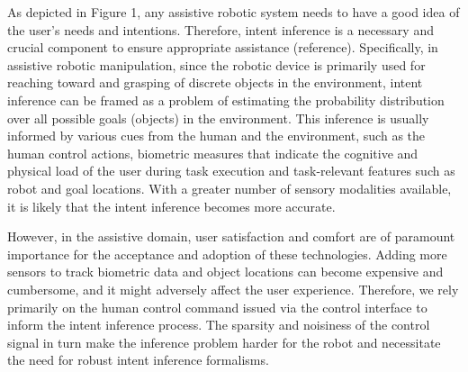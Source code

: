 As depicted in Figure 1, any assistive robotic system needs to have a good idea of the user's needs and intentions. Therefore, intent inference is a necessary and crucial component to ensure appropriate assistance (reference). Specifically, in assistive robotic manipulation, since the robotic device is primarily used for reaching toward and grasping of discrete objects in the environment, intent inference can be framed as a problem of estimating the probability distribution over all possible goals (objects) in the environment. This inference is usually informed by various cues from the human and the environment, such as the human control actions, biometric measures that indicate the cognitive and physical load of the user during task execution and task-relevant features such as robot and goal locations. With a greater number of sensory modalities available, it is likely that the intent inference becomes more accurate. 

However, in the assistive domain, user satisfaction and comfort are of paramount importance for the acceptance and adoption of these technologies. Adding more sensors to track biometric data and object locations can become expensive and cumbersome, and it might adversely affect the user experience. Therefore, we rely primarily on the human control command issued via the control interface to inform the intent inference process. The sparsity and noisiness of the control signal in turn make the inference problem harder for the robot and necessitate the need for robust intent inference formalisms. 

